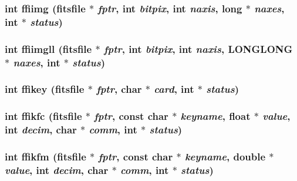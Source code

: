 \subsubsection{\setlength{\rightskip}{0pt plus 5cm}int ffiimg (\bf{fitsfile} $\ast$ {\em fptr}, int {\em bitpix}, int {\em naxis}, long $\ast$ {\em naxes}, int $\ast$ {\em status})}\label{test_2roimasker_2fitsio_8h_bdfe7ce055dc6e2df14de16381703b35}


\subsubsection{\setlength{\rightskip}{0pt plus 5cm}int ffiimgll (\bf{fitsfile} $\ast$ {\em fptr}, int {\em bitpix}, int {\em naxis}, \bf{LONGLONG} $\ast$ {\em naxes}, int $\ast$ {\em status})}\label{test_2roimasker_2fitsio_8h_657626db84e4c427330c2684375832d5}


\subsubsection{\setlength{\rightskip}{0pt plus 5cm}int ffikey (\bf{fitsfile} $\ast$ {\em fptr}, char $\ast$ {\em card}, int $\ast$ {\em status})}\label{test_2roimasker_2fitsio_8h_3fad2ca6c44422526a0994f06d424607}


\subsubsection{\setlength{\rightskip}{0pt plus 5cm}int ffikfc (\bf{fitsfile} $\ast$ {\em fptr}, const char $\ast$ {\em keyname}, float $\ast$ {\em value}, int {\em decim}, char $\ast$ {\em comm}, int $\ast$ {\em status})}\label{test_2roimasker_2fitsio_8h_39166dca79658791f345fcd1af07329d}


\subsubsection{\setlength{\rightskip}{0pt plus 5cm}int ffikfm (\bf{fitsfile} $\ast$ {\em fptr}, const char $\ast$ {\em keyname}, double $\ast$ {\em value}, int {\em decim}, char $\ast$ {\em comm}, int $\ast$ {\em status})}\label{test_2roimasker_2fitsio_8h_a7af1984471fc7e31de5f5a5111407e4}


